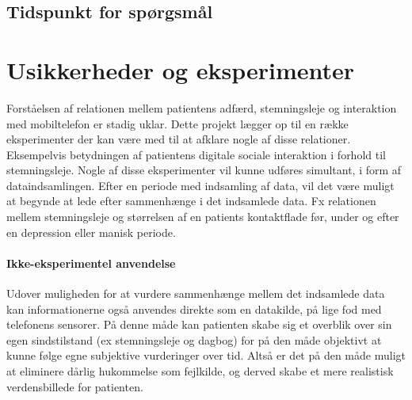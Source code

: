 \subsection{Tidspunkt for spørgsmål}


\section{Usikkerheder og eksperimenter}
Forståelsen af relationen mellem patientens adfærd, stemningsleje og interaktion med mobiltelefon er stadig uklar.
Dette projekt lægger op til en række eksperimenter der kan være med til at afklare nogle af disse relationer.
Eksempelvis betydningen af patientens digitale sociale interaktion i forhold til stemningsleje.
Nogle af disse eksperimenter vil kunne udføres simultant, i form af dataindsamlingen.
Efter en periode med indsamling af data, vil det være muligt at begynde at lede efter sammenhænge i det indsamlede data.
Fx relationen mellem stemningsleje og størrelsen af en patients kontaktflade før, under og efter en depression eller manisk periode.

\paragraph{Ikke-eksperimentel anvendelse}
Udover muligheden for at vurdere sammenhænge mellem det indsamlede data kan informationerne også anvendes direkte som en datakilde, på lige fod med telefonens sensorer.
På denne måde kan patienten skabe sig et overblik over sin egen sindstilstand (ex stemningsleje og dagbog) for på den måde objektivt at kunne følge egne subjektive vurderinger over tid.
Altså er det på den måde muligt at eliminere dårlig hukommelse som fejlkilde, og derved skabe et mere realistisk verdensbillede for patienten.